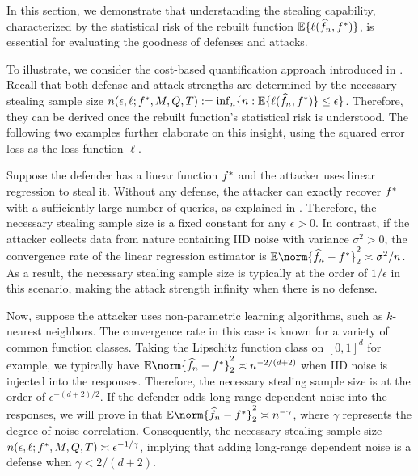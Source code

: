 
        In this section, we demonstrate that understanding the stealing capability, characterized by the statistical risk of the rebuilt function $\mathbb{E}\{ \ell(\widehat{f}_n, f^*)\}$, is essential for evaluating the goodness of defenses and attacks. 

        To illustrate, we consider the cost-based quantification approach introduced in . Recall that both defense and attack strengths are determined by the necessary stealing sample size $n(\epsilon,\ell;f^*,M,Q,T) := \inf_n\{n:  \mathbb{E} \{\ell(\widehat{f}_n, f^*) \}\leq \epsilon\}$. Therefore, they can be derived once the rebuilt function's statistical risk is understood. The following two examples further elaborate on this insight, using the squared error loss as the loss function $\ell$.

        \begin{example}
            Suppose the defender has a linear function $f^*$ and the attacker uses linear regression to steal it. Without any defense, the attacker can exactly recover $f^*$ with a sufficiently large number of queries, as explained in . Therefore, the necessary stealing sample size is a fixed constant for any $\epsilon>0$. In contrast, if the attacker collects data from nature containing IID noise with variance $\sigma^2>0$, the convergence rate of the linear regression estimator is $\E \norm{\hat{f}_n- \fd}_2^2 \asymp \sigma^2/n$. As a result, the necessary stealing sample size is typically at the order of $1/\epsilon$ in this scenario, making the attack strength infinity when there is no defense.
        \end{example}

        \begin{example}\label{ex:steal_nonpara}
            Now, suppose the attacker uses non-parametric learning algorithms, such as $k$-nearest neighbors. The convergence rate in this case is known for a variety of common function classes. Taking the Lipschitz function class on $[0,1]^d$ for example, we typically have $\E \norm{\hat{f}_n- \fd}_2^2 \asymp n^{-2/(d+2)}$ when IID noise is injected into the responses. Therefore, the necessary stealing sample size is at the order of $\epsilon^{-(d+2)/2}$.
            If the defender adds long-range dependent noise into the responses, we will prove in  that $\E \norm{\hat{f}_n- \fd}_2^2 \asymp n^{-\gamma}$, where $\gamma$ represents the degree of noise correlation. Consequently, the necessary stealing sample size $n(\epsilon,\ell;f^*,M,Q,T) \asymp \epsilon^{-1/\gamma}$, implying that adding long-range dependent noise is a \eco defense when $\gamma < 2/(d+2)$. 
        \end{example}
       

